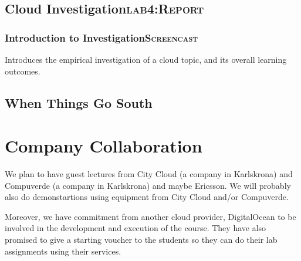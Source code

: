 \documentclass[11pt]{article}
\begin{document}
\subsection[Cloud Investigation]{Cloud Investigation\hfill{}\textsc{lab4:Report}}
\label{sec-3-11}
\subsubsection[Introduction to Investigation]{Introduction to Investigation\hfill{}\textsc{Screencast}}
\label{sec-3-11-1}
Introduces the empirical investigation of a cloud topic, and its overall learning outcomes.
\subsection{When Things Go South}
\label{sec-3-12}
\section{Company Collaboration}
\label{sec-4}
We plan to have guest lectures from City Cloud (a company in Karlskrona) and Compuverde (a company in Karlskrona) and maybe Ericsson. We will probably also do demonstartions using equipment from City Cloud and/or Compuverde.

Moreover, we have commitment from another cloud provider, DigitalOcean to be involved in the development and execution of the course. They have also promised to give a starting voucher to the students so they can do their lab assignments using their services.
\end{document}
